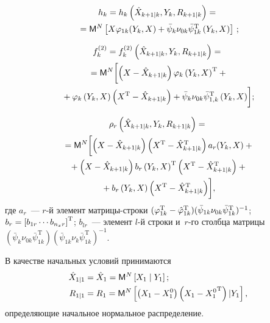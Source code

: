 \begin{multicols}{2}
    \noindent
    \begin{multline*}
    h_k = h_k \left(\hat X_{k+1\mid k}, Y_k, R_{k+1\mid k}\right) ={}\\
    {}=
     {\sf M}^N \left[ X\varphi_{1k} (Y_k,X)+ \bar\psi_k\nu_{0k}\bar\psi_{1k}^{\mathrm{T}} 
     \left(Y_k,X\right)\right]\,;
    \end{multline*}
    
    \vspace*{-12pt}

\noindent
\begin{multline*}
    f_k^{(2)}= f_k^{(2)} \left(\hat X_{k+1\mid k}, Y_k, R_{k+1\mid k}\right) ={}\\
    {}=
    {\sf M}^N \biggl[ \left(X- \hat X_{k+1\mid k}\right) \varphi_k \left(Y_k, X\right)^{\mathrm{T}}+{}\\
{}+\varphi_k \left(Y_k,X\right) 
\left(X^{\mathrm{T}} - \hat X_{k+1\mid k}\right)+
\bar\psi_k\nu_{0k}\bar\psi_{1,k}^{\mathrm{T}} \left(Y_k,X\right)\biggr];
\end{multline*}

\vspace*{-12pt}

\noindent
\begin{multline*}
\rho_r \left(\hat X_{k+1\mid k}, Y_k, R_{k+1\mid k}\right)={}\\
{}=
{\sf M}^N \biggl[ \left(X- \hat X_{k+1\mid k}\right) 
\left(X^{\mathrm{T}}-\hat X_{k+1\mid k}^{\mathrm{T}}\right) a_r (Y_k, X)+{}\\
{}+ \left(X-\hat X_{k+1\mid k}\right) b_r \left(Y_k,X\right)^{\mathrm{T}} 
\left(X^{\mathrm{T}} -\hat X_{k+1\mid k}^{\mathrm{T}}\right)+{}\\
{}+
b_r \left(Y_k,X\right) 
\left(X^{\mathrm{T}}-\hat X_{k+1\mid k}^{\mathrm{T}}\right)\biggr],
\end{multline*}
где $a_r$~--- $r$-й элемент мат\-ри\-цы-стро\-ки $(\vrp_{1k}^{\mathrm{T}}
\hm-\hat\vrp_{1k}^{\mathrm{T}})(\bar\psi_{1k}\nu_{0k}\bar\psi_{1k}^{\mathrm{T}})^{-1}$; 
$b_r \hm= \lk b_{1r}\cdots b_{n_x r}\rk^{\mathrm{T}}$; $ b_{lr}$~--- элемент $l$-й
строки и~$r$-го столб\-ца мат\-ри\-цы $(\bar\psi_k
\nu_{0k}\bar\psi_{1k}^{\mathrm{T}}) 
(\bar\psi_{1k}\nu_k\bar\psi_{1k}^{\mathrm{T}})^{-1}$.

В качестве начальных условий принимаются
    \begin{align*}
    \hat X_{1\mid 1} &= \hat X_1 ={\sf M}^N\left[ X_1\mid Y_1\right] ;
    \\ 
    R_{1\mid 1} &= R_1 = {\sf M}^N \left[ \left(X_1 -X_1^0\right) 
    \left(X_1-{X_1^0}^{\mathrm{T}}\right)\vert Y_1\right], 
    \end{align*}
определяющие начальное нормальное распределение.



\end{multicols}
